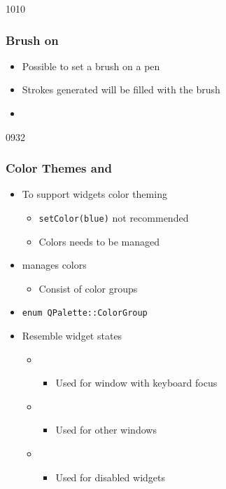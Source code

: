 \begin{slide}[fragile]{1010}\frametitle{Brush on }
\begin{itemize}
\item Possible to set a brush on a pen
\item Strokes generated will be filled with the brush
\vfill
  \vfill
\item {}
\end{itemize}
\end{slide}

\begin{slide}{0932}\frametitle{Color Themes and }
\begin{itemize}
  \item To support widgets color theming
  \begin{itemize}
    \item \texttt{setColor(blue)} not recommended
    \item Colors needs to be managed
  \end{itemize} 
  \item {} manages colors
  \begin{itemize}
    \item Consist of color groups
  \end{itemize}     
\end{itemize}     
\vspace{5mm}
\begin{itemize}
  \item \texttt{enum QPalette::ColorGroup}
  \item Resemble widget states 
  \begin{itemize}
    \item {} 
    \begin{itemize}    
    	\item Used for window with keyboard focus
    \end{itemize}    
    \item {}
    \begin{itemize}    
    	\item Used for other windows
    \end{itemize}    
    \item {}
    \begin{itemize}    
    	\item Used for disabled widgets
    \end{itemize}    
  \end{itemize}     
\end{itemize}
\end{slide}

